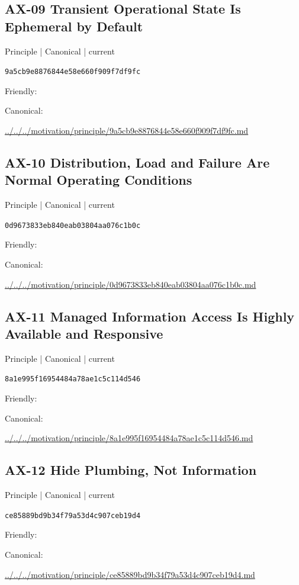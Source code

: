 \documentclass[10pt,a4paper]{article}
\begin{document}
\subsection*{AX-09 Transient Operational State Is Ephemeral by Default}
{\small Principle | Canonical | current}\par
\texttt{9a5cb9e8876844e58e660f909f7df9fc}\par
Friendly: \par
Canonical: \par
{\footnotesize\url{../../../motivation/principle/9a5cb9e8876844e58e660f909f7df9fc.md}}\par
\subsection*{AX-10 Distribution, Load and Failure Are Normal Operating Conditions}
{\small Principle | Canonical | current}\par
\texttt{0d9673833eb840eab03804aa076c1b0c}\par
Friendly: \par
Canonical: \par
{\footnotesize\url{../../../motivation/principle/0d9673833eb840eab03804aa076c1b0c.md}}\par
\subsection*{AX-11 Managed Information Access Is Highly Available and Responsive}
{\small Principle | Canonical | current}\par
\texttt{8a1e995f16954484a78ae1c5c114d546}\par
Friendly: \par
Canonical: \par
{\footnotesize\url{../../../motivation/principle/8a1e995f16954484a78ae1c5c114d546.md}}\par
\subsection*{AX-12 Hide Plumbing, Not Information}
{\small Principle | Canonical | current}\par
\texttt{ce85889bd9b34f79a53d4c907ceb19d4}\par
Friendly: \par
Canonical: \par
{\footnotesize\url{../../../motivation/principle/ce85889bd9b34f79a53d4c907ceb19d4.md}}\par
\end{document}
